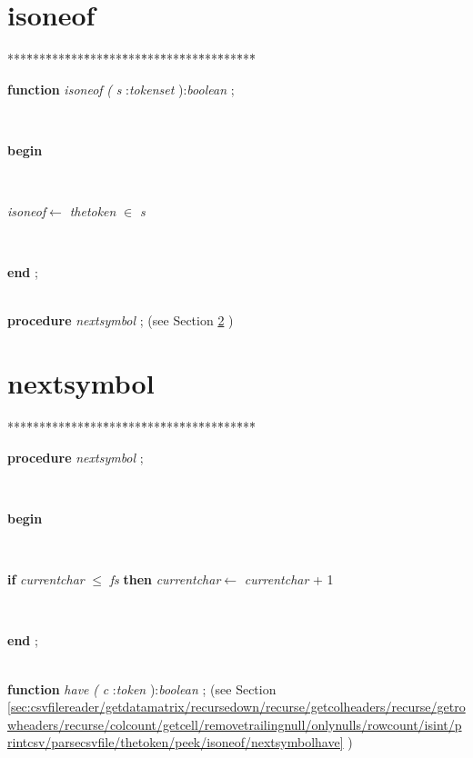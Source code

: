 \section{isoneof}\label{sec:csvfilereader/getdatamatrix/recursedown/recurse/getcolheaders/recurse/getrowheaders/recurse/colcount/getcell/removetrailingnull/onlynulls/rowcount/isint/printcsv/parsecsvfile/thetoken/peekisoneof}

\begin{tabbing}
***\=***\=***\=***\=***\=***\=***\=***\=***\=***\=***\=***\=***\=\kill
\parbox{14cm}{\textsf{\textbf{function}  \textit{isoneof}  \textit{(} \textit{s} :\textit{tokenset} ):\textit{boolean} ;}}\\
\+\parbox{14cm}{\textsf{\textbf{begin} }}\\
\parbox{14cm}{\textsf{\textit{isoneof}$\leftarrow$ \textit{thetoken} $\in$ \textit{s}}}\\
\<\-\parbox{14cm}{\textsf{\textbf{end} ;}}\\
\+\textsf{\textbf{procedure}  \textit{nextsymbol} ;} (see Section \ref{sec:csvfilereader/getdatamatrix/recursedown/recurse/getcolheaders/recurse/getrowheaders/recurse/colcount/getcell/removetrailingnull/onlynulls/rowcount/isint/printcsv/parsecsvfile/thetoken/peek/isoneofnextsymbol} )\\
\end{tabbing}
\section{nextsymbol}\label{sec:csvfilereader/getdatamatrix/recursedown/recurse/getcolheaders/recurse/getrowheaders/recurse/colcount/getcell/removetrailingnull/onlynulls/rowcount/isint/printcsv/parsecsvfile/thetoken/peek/isoneofnextsymbol}

\begin{tabbing}
***\=***\=***\=***\=***\=***\=***\=***\=***\=***\=***\=***\=***\=\kill
\parbox{14cm}{\textsf{\textbf{procedure}  \textit{nextsymbol} ;}}\\
\+\parbox{14cm}{\textsf{\textbf{begin} }}\\
\+\parbox{14cm}{\textsf {\textbf {if } \textsf{\textit{currentchar} $\leq$ \textit{fs}} \textbf{ then } \textsf{\textit{currentchar}$\leftarrow$ \textit{currentchar} + 1}}}\\
\<\-\<\-\parbox{14cm}{\textsf{\textbf{end} ;}}\\
\+\textsf{\textbf{function}  \textit{have} \textit{(} \textit{c} :\textit{token} ):\textit{boolean} ;} (see Section \ref{sec:csvfilereader/getdatamatrix/recursedown/recurse/getcolheaders/recurse/getrowheaders/recurse/colcount/getcell/removetrailingnull/onlynulls/rowcount/isint/printcsv/parsecsvfile/thetoken/peek/isoneof/nextsymbolhave} )\\
\end{tabbing}
